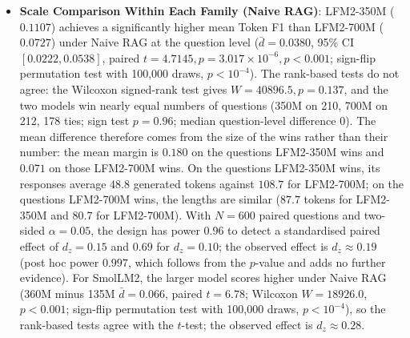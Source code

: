 \documentclass[10pt]{article}
\begin{document}
\begin{itemize}
    \item \textbf{Scale Comparison Within Each Family (Naive RAG)}: LFM2-350M ($0.1107$) achieves a significantly higher mean Token F1 than LFM2-700M ($0.0727$) under Naive RAG at the question level ($\bar{d} = 0.0380$, 95\% CI $[0.0222, 0.0538]$, paired $t=4.7145, p=3.017 \times 10^{-6}, p < 0.001$; sign-flip permutation test with 100,000 draws, $p<10^{-4}$). The rank-based tests do not agree: the Wilcoxon signed-rank test gives $W=40896.5, p=0.137$, and the two models win nearly equal numbers of questions (350M on 210, 700M on 212, 178 ties; sign test $p=0.96$; median question-level difference $0$). The mean difference therefore comes from the size of the wins rather than their number: the mean margin is $0.180$ on the questions LFM2-350M wins and $0.071$ on those LFM2-700M wins. On the questions LFM2-350M wins, its responses average $48.8$ generated tokens against $108.7$ for LFM2-700M; on the questions LFM2-700M wins, the lengths are similar ($87.7$ tokens for LFM2-350M and $80.7$ for LFM2-700M). With $N=600$ paired questions and two-sided $\alpha=0.05$, the design has power $0.96$ to detect a standardised paired effect of $d_z=0.15$ and $0.69$ for $d_z=0.10$; the observed effect is $d_z \approx 0.19$ (post hoc power $0.997$, which follows from the $p$-value and adds no further evidence). For SmolLM2, the larger model scores higher under Naive RAG (360M minus 135M $\bar{d}=0.066$, paired $t=6.78$; Wilcoxon $W=18926.0$, $p<0.001$; sign-flip permutation test with 100,000 draws, $p<10^{-4}$), so the rank-based tests agree with the $t$-test; the observed effect is $d_z \approx 0.28$.

\end{itemize}
\end{document}
